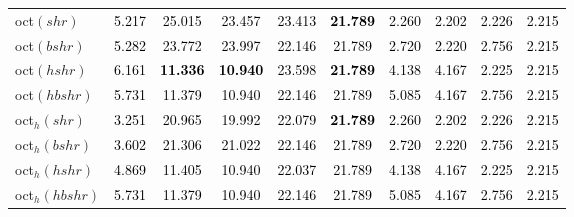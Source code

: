 \begin{tabular}[t]{>{\centering\arraybackslash}m{2.5cm}ccccccccc}
oct$(shr)$ & \textcolor{black}{5.217} & \textcolor{black}{25.015} & \textcolor{black}{23.457} & \textcolor{black}{23.413} & \textcolor{black}{\textbf{21.789}} & \textcolor{black}{2.260} & \textcolor{black}{2.202} & \textcolor{black}{2.226} & \textcolor{black}{2.215}\\
oct$(bshr)$ & \textcolor{black}{5.282} & \textcolor{black}{23.772} & \textcolor{black}{23.997} & \textcolor{black}{22.146} & \textcolor{black}{21.789} & \textcolor{black}{2.720} & \textcolor{black}{2.220} & \textcolor{black}{2.756} & \textcolor{black}{2.215}\\
oct$(hshr)$ & \textcolor{black}{6.161} & \textcolor{black}{\textbf{11.336}} & \textcolor{black}{\textbf{10.940}} & \textcolor{black}{23.598} & \textcolor{black}{\textbf{21.789}} & \textcolor{black}{4.138} & \textcolor{black}{4.167} & \textcolor{black}{2.225} & \textcolor{black}{2.215}\\
oct$(hbshr)$ & \textcolor{black}{5.731} & \textcolor{black}{11.379} & \textcolor{black}{10.940} & \textcolor{black}{22.146} & \textcolor{black}{21.789} & \textcolor{black}{5.085} & \textcolor{black}{4.167} & \textcolor{black}{2.756} & \textcolor{black}{2.215}\\
oct$_h(shr)$ & \textcolor{black}{3.251} & \textcolor{black}{20.965} & \textcolor{black}{19.992} & \textcolor{black}{22.079} & \textcolor{black}{\textbf{21.789}} & \textcolor{black}{2.260} & \textcolor{black}{2.202} & \textcolor{black}{2.226} & \textcolor{black}{2.215}\\
oct$_h(bshr)$ & \textcolor{black}{3.602} & \textcolor{black}{21.306} & \textcolor{black}{21.022} & \textcolor{black}{22.146} & \textcolor{black}{21.789} & \textcolor{black}{2.720} & \textcolor{black}{2.220} & \textcolor{black}{2.756} & \textcolor{black}{2.215}\\
oct$_h(hshr)$ & \textcolor{black}{4.869} & \textcolor{black}{11.405} & \textcolor{black}{10.940} & \textcolor{black}{22.037} & \textcolor{black}{21.789} & \textcolor{black}{4.138} & \textcolor{black}{4.167} & \textcolor{black}{2.225} & \textcolor{black}{2.215}\\
oct$_h(hbshr)$ & \textcolor{black}{5.731} & \textcolor{black}{11.379} & \textcolor{black}{10.940} & \textcolor{black}{22.146} & \textcolor{black}{21.789} & \textcolor{black}{5.085} & \textcolor{black}{4.167} & \textcolor{black}{2.756} & \textcolor{black}{2.215}\\
\bottomrule
\end{tabular}
